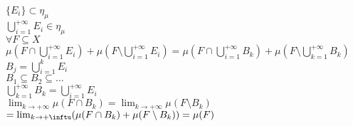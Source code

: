 \documentclass[12px]{article}
\begin{document}
\begin{dimo}
			   $\{E_i\}\subset \eta_\mu$\\
			    $ \bigcup^{+\infty}_{i=1}E_i\in\eta_\mu$\\
			    $\forall F\subseteq X$\\
			     $\mu (F\cap \bigcup^{+\infty}_{i = 1}E_i) + \mu (F\setminus \bigcup^{+\infty}_{i = 1}E_i) = \mu (F\cap  \bigcup^{+\infty}_{i= 1}B_k ) + \mu (F\setminus  \bigcup^{+\infty}_{k=1}B_k)$\\
			     $B_j = \bigcup^{k}_{i =1} E_i$\\
			     $B_1\subseteq B_2\subseteq\ldots$\\
			     $ \bigcup^{+\infty}_{k = 1}B_k = \bigcup^{+\infty}_{i = 1}E_i$ \\
			     $\lim_{k \rightarrow +\infty} \mu (F\cap B_k) = \lim _{k \rightarrow +\infty} \mu (F\setminus B_k)$\\
			     $ = \lim_{k \rightarrow +\inftu} (\mu(F\cap B_k)  + \mu(F\setminus B_k)) = \mu (F)$
	\end{dimo}
	
	
	
\end{document}
